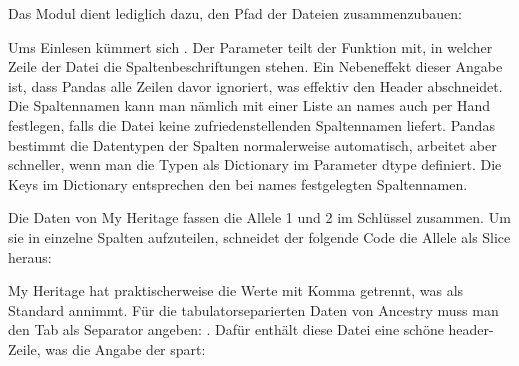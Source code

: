 \medskip



\medskip

Das Modul  dient lediglich dazu, den Pfad der Dateien zusammenzubauen:

\medskip




\medskip

Ums Einlesen kümmert sich . Der Parameter  teilt der Funktion mit, in welcher Zeile der Datei die Spaltenbeschriftungen stehen. Ein Nebeneffekt dieser Angabe ist, dass Pandas alle Zeilen davor ignoriert, was effektiv den Header abschneidet. Die Spaltennamen kann man nämlich mit einer Liste an names auch per Hand festlegen, falls die Datei keine zufriedenstellenden Spaltennamen liefert. Pandas bestimmt die Datentypen der Spalten normalerweise automatisch, arbeitet aber schneller, wenn man die Typen als Dictionary im Parameter dtype definiert. Die Keys im Dictionary entsprechen den bei names festgelegten Spaltennamen.
	
Die Daten von My Heritage fassen die Allele 1 und 2 im Schlüssel   zusammen. Um sie in einzelne Spalten aufzuteilen, schneidet der folgende Code die Allele als Slice heraus:

\medskip
	


\medskip

My Heritage hat praktischerweise die Werte mit Komma getrennt, was  als Standard annimmt. Für die tabulatorseparierten Daten von Ancestry muss man den Tab als Separator angeben: . Dafür enthält diese Datei eine schöne header-Zeile, was die Angabe der  spart:
	
\medskip
	

